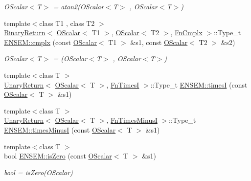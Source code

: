 \begin{DoxyCompactItemize}
\begin{DoxyCompactList}\small\item\em O\+Scalar$<$\+T$>$ = atan2(\+O\+Scalar$<$\+T$>$ , O\+Scalar$<$\+T$>$) \end{DoxyCompactList}\item 
{\footnotesize template$<$class T1 , class T2 $>$ }\\\mbox{\hyperlink{structENSEM_1_1BinaryReturn}{Binary\+Return}}$<$ \mbox{\hyperlink{classENSEM_1_1OScalar}{O\+Scalar}}$<$ T1 $>$, \mbox{\hyperlink{classENSEM_1_1OScalar}{O\+Scalar}}$<$ T2 $>$, \mbox{\hyperlink{structENSEM_1_1FnCmplx}{Fn\+Cmplx}} $>$\+::Type\+\_\+t \mbox{\hyperlink{group__obsscalar_gabf1bc6f0ef1fc4fa374ff48fddcbe9b3}{E\+N\+S\+E\+M\+::cmplx}} (const \mbox{\hyperlink{classENSEM_1_1OScalar}{O\+Scalar}}$<$ T1 $>$ \&s1, const \mbox{\hyperlink{classENSEM_1_1OScalar}{O\+Scalar}}$<$ T2 $>$ \&s2)
\begin{DoxyCompactList}\small\item\em O\+Scalar$<$\+T$>$ = (O\+Scalar$<$\+T$>$ , O\+Scalar$<$\+T$>$) \end{DoxyCompactList}\item 
{\footnotesize template$<$class T $>$ }\\\mbox{\hyperlink{structENSEM_1_1UnaryReturn}{Unary\+Return}}$<$ \mbox{\hyperlink{classENSEM_1_1OScalar}{O\+Scalar}}$<$ T $>$, \mbox{\hyperlink{structENSEM_1_1FnTimesI}{Fn\+TimesI}} $>$\+::Type\+\_\+t \mbox{\hyperlink{group__obsscalar_gad7403718b5f9341f1aafa59ca287ea31}{E\+N\+S\+E\+M\+::timesI}} (const \mbox{\hyperlink{classENSEM_1_1OScalar}{O\+Scalar}}$<$ T $>$ \&s1)
\item 
{\footnotesize template$<$class T $>$ }\\\mbox{\hyperlink{structENSEM_1_1UnaryReturn}{Unary\+Return}}$<$ \mbox{\hyperlink{classENSEM_1_1OScalar}{O\+Scalar}}$<$ T $>$, \mbox{\hyperlink{structENSEM_1_1FnTimesMinusI}{Fn\+Times\+MinusI}} $>$\+::Type\+\_\+t \mbox{\hyperlink{group__obsscalar_ga1dc10f8daa357f1e30ce7e8bce41c52e}{E\+N\+S\+E\+M\+::times\+MinusI}} (const \mbox{\hyperlink{classENSEM_1_1OScalar}{O\+Scalar}}$<$ T $>$ \&s1)
\item 
{\footnotesize template$<$class T $>$ }\\bool \mbox{\hyperlink{group__obsscalar_gacdda3d4e73f6b414d6c2d99e3f69af85}{E\+N\+S\+E\+M\+::is\+Zero}} (const \mbox{\hyperlink{classENSEM_1_1OScalar}{O\+Scalar}}$<$ T $>$ \&s1)
\begin{DoxyCompactList}\small\item\em bool = is\+Zero(\+O\+Scalar) \end{DoxyCompactList}\item 

\end{DoxyCompactItemize}
